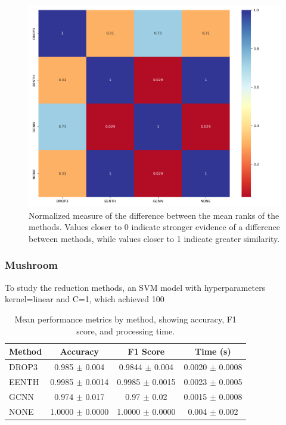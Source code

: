 \begin{figure}[t]
    \centering
    \includegraphics[width=\textwidth]{figures/svm/hepatitis/svm_results_heatmap.png}
    \caption{Normalized measure of the difference between the mean ranks of the methods. Values closer to 0 indicate stronger evidence of a difference between methods, while values closer to 1 indicate greater similarity.}
    \label{fig:hep_svm_red}
\end{figure}

\subsubsection{Mushroom}

To study the reduction methods, an SVM model with hyperparameters kernel=linear and C=1, which achieved 100%

\begin{table}[h!]
\centering
\begin{tabular}{|l|c|c|c|}
\hline
\textbf{Method} & \textbf{Accuracy} & \textbf{F1 Score} & \textbf{Time (s)} \\
\hline
DROP3 & 0.985 $\pm$ 0.004 & 0.9844 $\pm$ 0.004 & 0.0020 $\pm$ 0.0008 \\
\hline
EENTH & 0.9985 $\pm$ 0.0014 & 0.9985 $\pm$ 0.0015 & 0.0023 $\pm$ 0.0005 \\
\hline
GCNN  & 0.974 $\pm$ 0.017 & 0.97 $\pm$ 0.02 & 0.0015 $\pm$ 0.0008 \\
\hline
NONE  & 1.0000 $\pm$ 0.0000 & 1.0000 $\pm$ 0.0000 & 0.004 $\pm$ 0.002 \\
\hline
\end{tabular}
\caption{Mean performance metrics by method, showing accuracy, F1 score, and processing time.}
\label{tab:method_metrics_m}
\end{table}


